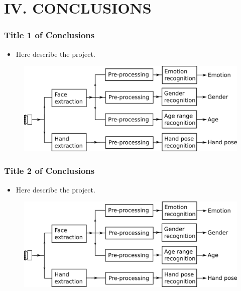 \documentclass{beamer}
\begin{document}
\section{IV. CONCLUSIONS} 



\begin{frame}\frametitle{Title 1 of Conclusions}

\begin{itemize}
\item Here describe the project.
\end{itemize}

\begin{figure}
\includegraphics[scale=0.4]{images/diagram.png}
\end{figure}

\end{frame}



\begin{frame}\frametitle{Title 2 of Conclusions}

\begin{itemize}
\item Here describe the project.
\end{itemize}

\begin{figure}
\includegraphics[scale=0.4]{images/diagram.png}
\end{figure}

\end{frame}
\end{document}
